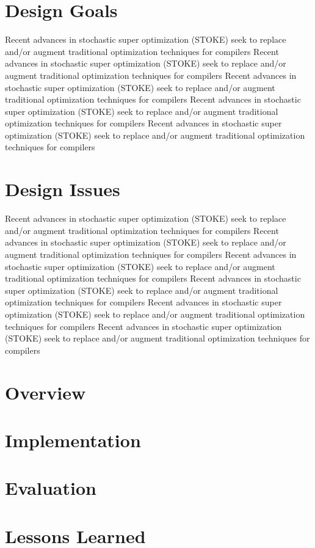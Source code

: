\documentclass{article}
\begin{document}
\section{Design Goals}

Recent advances in stochastic super optimization (STOKE) seek to replace and/or augment traditional optimization techniques for compilers
Recent advances in stochastic super optimization (STOKE) seek to replace and/or augment traditional optimization techniques for compilers
Recent advances in stochastic super optimization (STOKE) seek to replace and/or augment traditional optimization techniques for compilers
Recent advances in stochastic super optimization (STOKE) seek to replace and/or augment traditional optimization techniques for compilers
Recent advances in stochastic super optimization (STOKE) seek to replace and/or augment traditional optimization techniques for compilers
\section{Design Issues}

Recent advances in stochastic super optimization (STOKE) seek to replace and/or augment traditional optimization techniques for compilers
Recent advances in stochastic super optimization (STOKE) seek to replace and/or augment traditional optimization techniques for compilers
Recent advances in stochastic super optimization (STOKE) seek to replace and/or augment traditional optimization techniques for compilers
Recent advances in stochastic super optimization (STOKE) seek to replace and/or augment traditional optimization techniques for compilers
Recent advances in stochastic super optimization (STOKE) seek to replace and/or augment traditional optimization techniques for compilers
Recent advances in stochastic super optimization (STOKE) seek to replace and/or augment traditional optimization techniques for compilers
\section{Overview}
\section{Implementation}
\section{Evaluation}
\section{Lessons Learned}
\end{document}
